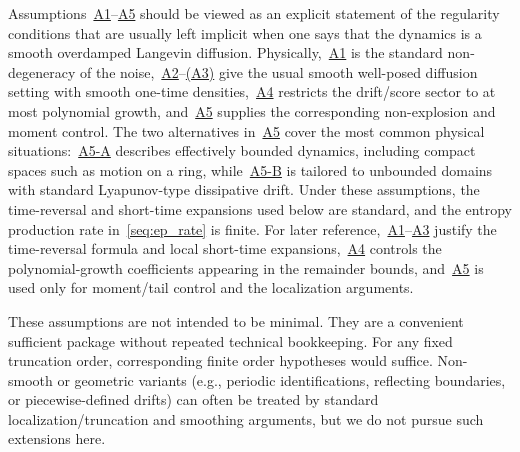 \documentclass[
 longbibliography,
 twocolumn,
 superscriptaddress,
 amsmath,
 amssymb,
 amsthm,
 amsfonts,
 prl,
 floatfix,
]{revtex4-2}
\newcommand{\matbf}[1]{\boldsymbol{\mathsf{#1}}}
\begin{document}
\begin{widetext}
Assumptions~\hyperlink{assumption:A1}{A1}--\hyperlink{assumption:A5}{A5} should be viewed as an explicit statement of the regularity conditions that are usually left implicit when one says that the dynamics is a smooth overdamped Langevin diffusion. Physically,~\hyperlink{assumption:A1}{A1} is the standard non-degeneracy of the noise,~\hyperlink{assumption:A2}{A2}--\hyperlink{assumption:A3}{(A3)} give the usual smooth well-posed diffusion setting with smooth one-time densities,~\hyperlink{assumption:A4}{A4} restricts the drift/score sector to at most polynomial growth, and~\hyperlink{assumption:A5}{A5} supplies the corresponding non-explosion and moment control. The two alternatives in~\hyperlink{assumption:A5}{A5} cover the most common physical situations:~\hyperlink{assumption:A5-A}{A5-A} describes effectively bounded dynamics, including compact spaces such as motion on a ring, while~\hyperlink{assumption:A5-B}{A5-B} is tailored to unbounded domains with standard Lyapunov-type dissipative drift. Under these assumptions, the time-reversal and short-time expansions used below are standard, and the entropy production rate in~\eqref{seq:ep_rate} is finite.
For later reference,~\hyperlink{assumption:A1}{A1}--\hyperlink{assumption:A3}{A3} justify the time-reversal formula and local short-time expansions,~\hyperlink{assumption:A4}{A4} controls the polynomial-growth coefficients appearing in the remainder bounds, and~\hyperlink{assumption:A5}{A5} is used only for moment/tail control and the localization arguments.

These assumptions are not intended to be minimal. They are a convenient sufficient package without repeated technical bookkeeping. For any fixed truncation order, corresponding finite order hypotheses would suffice. Non-smooth or geometric variants (e.g., periodic identifications, reflecting boundaries, or piecewise-defined drifts) can often be treated by standard localization/truncation and smoothing arguments, but we do not pursue such extensions here.



\end{widetext}
\end{document}
